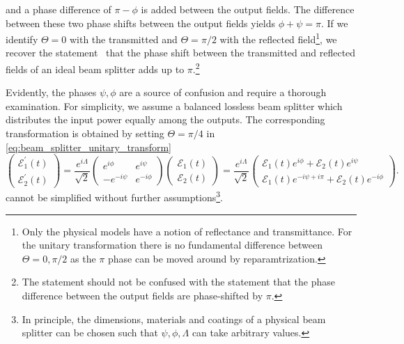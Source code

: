 and a phase difference of $\pi-\phi$ is added between the output fields.
The difference between these two phase shifts between the output fields yields $\phi+\psi=\pi$.
If we identify $\Theta=0$ with the transmitted and $\Theta=\pi/2$ with the reflected field\footnote{Only the physical models have a notion of reflectance and transmittance. For the unitary transformation there is no fundamental difference between $\Theta=0,\pi/2$ as the $\pi$ phase can be moved around by reparamtrization.}, we recover the statement~\cite{Zeilinger1981} that the phase shift between the transmitted and reflected fields of an ideal beam splitter adds up to $\pi$.\footnote{The statement should not be confused with the statement that the phase difference between the output fields are phase-shifted by $\pi$.}

Evidently, the phases $\psi,\phi$ are a source of confusion and require a thorough examination.
For simplicity, we assume a balanced lossless beam splitter which distributes the input power equally among the outputs.
The corresponding transformation is obtained by setting $\Theta=\pi/4$ in \cref{eq:beam_splitter_unitary_transform}
\begin{equation}
    \begin{pmatrix}
        \mathcal{E}_1^\prime(t)
        \\
        \mathcal{E}_2^\prime(t)
    \end{pmatrix}
    =
    \frac{e^{i\Lambda}}{\sqrt{2}}
    \begin{pmatrix}
        e^{i\phi} & e^{i\psi}
        \\
        -e^{-i\psi} & e^{-i\phi}
    \end{pmatrix}
    \begin{pmatrix}
        \mathcal{E}_1(t)
        \\
        \mathcal{E}_2(t)
    \end{pmatrix}
    =
    \frac{e^{i\Lambda}}{\sqrt{2}}
    \begin{pmatrix}
        \mathcal{E}_1(t)e^{i\phi}+\mathcal{E}_2(t)e^{i\psi}
        \\
        \mathcal{E}_1(t)e^{-i\psi+i\pi}+\mathcal{E}_2(t)e^{-i\phi}
    \end{pmatrix}
    \label{eq:beam_splitter_unitary_transform_balanced}.
\end{equation}
 cannot be simplified without further assumptions\footnote{In principle, the dimensions, materials and coatings of a physical beam splitter can be chosen such that $\psi,\phi,\Lambda$ can take arbitrary values.}.
